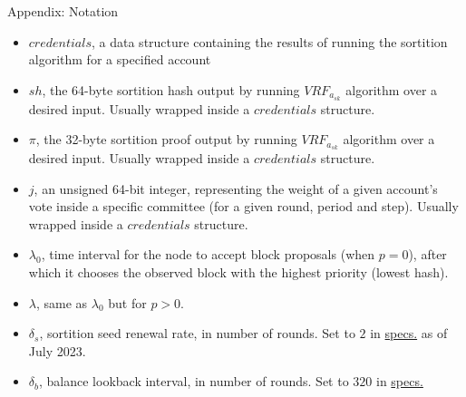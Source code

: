 \documentclass[10pt,a4paper]{article}
\begin{document}
\begin{section}{Appendix: Notation}


\begin{itemize}
    \item $credentials$, a data structure containing the results of running the sortition algorithm 
    for a specified account
    \item $sh$, the 64-byte sortition hash output by running $VRF_{a_{sk}}$ algorithm over a desired input.
    Usually wrapped inside a $credentials$ structure.
    \item $\pi$, the 32-byte sortition proof output by running $VRF_{a_{sk}}$ algorithm over a desired input.
    Usually wrapped inside a $credentials$ structure.
    \item $j$, an unsigned 64-bit integer, representing the weight of a given account's vote inside a specific committee
    (for a given round, period and step).
    Usually wrapped inside a $credentials$ structure.
    \item $\lambda_0$, time interval for the node to accept block proposals (when $p=0$), after which it 
    chooses the observed block with the highest priority (lowest hash).
    \item $\lambda$, same as $\lambda_0$ but for $p > 0$.
    \item $\delta_s$, sortition seed renewal rate, in number of rounds. Set to $2$ in 
    \href{https://github.com/algorandfoundation/specs}{specs.} as of July 2023.
    \item $\delta_b$, balance lookback interval, in number of rounds. Set to $320$ in 
    \href{https://github.com/algorandfoundation/specs}{specs.}

\end{itemize}

\end{section}
\end{document}
